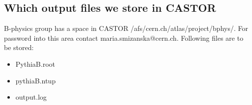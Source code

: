 \subsection{Which output  files we store in CASTOR}
B-physics group has a space in CASTOR
/afs/cern.ch/atlas/project/bphys/.
For password  into this area contact maria.smizanska@cern.ch.
Following files are to be stored:

\begin{itemize}
\vspace{-3mm}\item  PythiaB.root
\vspace{-3mm}\item  pythiaB.ntup
\vspace{-3mm}\item  output.log
\end{itemize}






